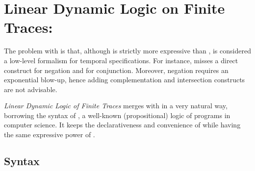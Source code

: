 \section{Linear Dynamic Logic on Finite Traces: \LDLf}
\label{sect:ldlf}
The problem with \RE is that, although is strictly more expressive than \LTLf, is considered a low-level formalism for temporal specifications. For instance, \RE misses a direct construct for negation and for conjunction. Moreover, negation requires an exponential blow-up, hence adding complementation and intersection constructs are not advisable.

\emph{Linear Dynamic Logic of Finite Traces} \LDLf \citep{de2013linear} merges \LTLf with \RE in a very natural way, borrowing the syntax of \PDL \citep{FISCHER1979194}, a well-known (propositional) logic of programs in computer science. It keeps the declarativeness and convenience of \LTLf while having the same expressive power of \RE. 

\subsection{Syntax}\label{ldlf-syntax}

